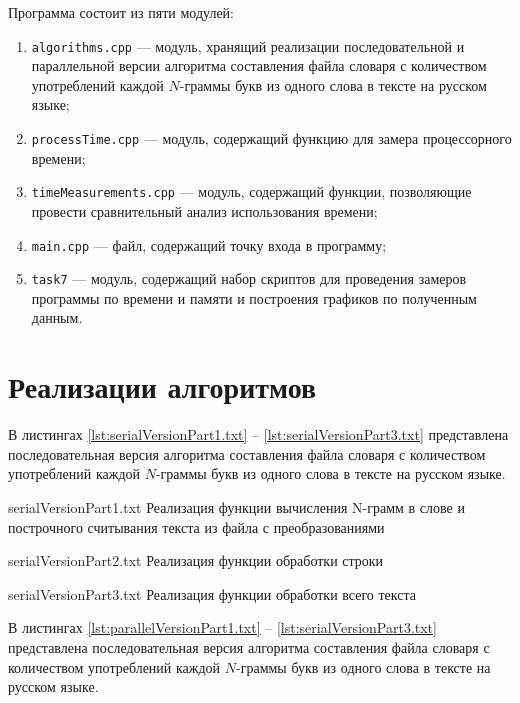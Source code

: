 Программа состоит из пяти модулей: 

\begin{enumerate}[label={\arabic*)}]
	\item \texttt{algorithms.cpp} --- модуль, хранящий реализации последовательной и параллельной версии алгоритма составления файла словаря с количеством употреблений каждой $N$-граммы букв из одного слова в тексте на русском языке;
	\item \texttt{processTime.cpp} --- модуль, содержащий функцию для замера процессорного времени;
	\item \texttt{timeMeasurements.cpp} --- модуль, содержащий функции, позволяющие провести сравнительный анализ использования времени;
	\item \texttt{main.cpp} --- файл, содержащий точку входа в программу;
	\item \texttt{task7} --- модуль, содержащий набор скриптов для проведения замеров программы по времени и памяти и построения графиков по полученным данным.
\end{enumerate}

\clearpage

\section{Реализации алгоритмов}

В листингах \ref{lst:serialVersionPart1.txt} -- \ref{lst:serialVersionPart3.txt} представлена последовательная версия алгоритма составления файла словаря с количеством употреблений каждой $N$-граммы букв из одного слова в тексте на русском языке.

{serialVersionPart1.txt} %
{Реализация функции вычисления N-грамм в слове и построчного считывания текста из файла с преобразованиями} %

\clearpage

{serialVersionPart2.txt} %
{Реализация функции обработки строки} %

\clearpage

{serialVersionPart3.txt} %
{Реализация функции обработки всего текста} %

\clearpage

В листингах \ref{lst:parallelVersionPart1.txt} -- \ref{lst:serialVersionPart3.txt} представлена последовательная версия алгоритма составления файла словаря с количеством употреблений каждой $N$-граммы букв из одного слова в тексте на русском языке.

